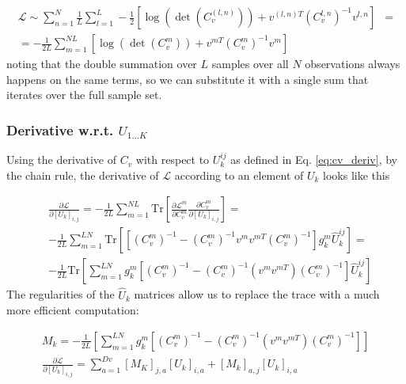 \documentclass{paper}
\begin{document}
\begin{equation}
\begin{split}
\mathcal{L} \sim \sum_{n=1}^N \frac{1}{L} \sum_{l=1}^L -\frac{1}{2} \left[\log \left( \det \left( C_v^{(l,n)} \right) \right) + v^{(l,n)T}  \left( C_v^{l,n} \right)^{-1} v^{l,n}\right]& = \\
= -\frac{1}{2L} \sum_{m=1}^{NL} \left[ \log \left( \det \left( C_v^{m} \right) \right) + v^{mT}  \left( C_v^{m} \right)^{-1} v^m \right]&
\end{split}
\end{equation}
%
noting that the double summation over $L$ samples over all $N$ observations always happens on the same terms, so we can substitute it with a single sum that iterates over the full sample set.


\subsubsection{Derivative w.r.t. $U_{1\dots K}$}

Using the derivative of $C_v$ with respect to $U_k^{ij}$ as defined in Eq. \ref{eq:cv_deriv}, by the chain rule, the derivative of $\mathcal{L}$ according to an element of $U_k$ looks like this

\begin{equation}
\begin{split}
&\frac{\partial \mathcal{L}}{\partial \left[ U_k \right]_{i,j}} = -\frac{1}{2L} \sum_{m=1}^{NL} \textrm{Tr} \left[ \frac{\partial \mathcal{L}^m}{\partial C_v^m} \frac{\partial C_v^m}{\partial \left[ U_k \right]_{i,j}} \right] = \\
& -\frac{1}{2L} \sum_{m=1}^{LN} \textrm{Tr} \left[  \left[ \left( C_v^m \right)^{-1} - \left( C_v^m \right)^{-1} v^m v^{mT} \left( C_v^m \right)^{-1} \right] g_k^{m} \hat U_k^{ij} \right] = \\
& -\frac{1}{2L} \textrm{Tr} \left[ \sum_{m=1}^{LN} g_k^{m} \left[ \left( C_v^m \right)^{-1} -  \left( C_v^m \right)^{-1} \left( v^m v^{mT} \right) \left( C_v^m \right)^{-1} \right] \hat U_k^{ij} \right]
\end{split}
\end{equation}
%
The regularities of the $\hat U_k$ matrices allow us to replace the trace with a much more efficient computation:

\begin{eqnarray}
M_k = -\frac{1}{2L} \left[ \sum_{m=1}^{LN} g_k^{m} \left[ \left( C_v^m \right)^{-1} -  \left( C_v^m \right)^{-1} \left( v^m v^{mT} \right) \left( C_v^m \right)^{-1} \right]\right] \label{eq:cdll_deriv_mat} \\
\frac{\partial \mathcal{L}}{\partial \left[ U_k \right]_{i,j}} = \sum_{a=1}^{Dv} \left[ M_K \right]_{j,a} \left[ U_k \right]_{i,a} + \left[ M_k \right]_{a,j} \left[ U_k \right]_{i,a}
\end{eqnarray}
\end{document}
